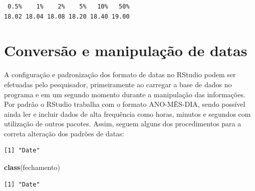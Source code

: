 \documentclass[12pt,brazil,oneside]{book}
\newenvironment{Shaded}{\begin{snugshade}}{\end{snugshade}}
\newcommand{\CommentTok}[1]{\textcolor[rgb]{0.56,0.35,0.01}{\textit{#1}}}
\newcommand{\DataTypeTok}[1]{\textcolor[rgb]{0.13,0.29,0.53}{#1}}
\newcommand{\KeywordTok}[1]{\textcolor[rgb]{0.13,0.29,0.53}{\textbf{#1}}}
\newcommand{\NormalTok}[1]{#1}
\newcommand{\StringTok}[1]{\textcolor[rgb]{0.31,0.60,0.02}{#1}}
\begin{document}
\begin{verbatim}
 0.5%    1%    2%    5%   10%   50% 
18.02 18.04 18.08 18.20 18.40 19.00 
\end{verbatim}

\hypertarget{conversao-e-manipulacao-de-datas}{%
\section{Conversão e manipulação de datas}\label{conversao-e-manipulacao-de-datas}}

A configuração e padronização dos formato de datas no RStudio podem ser efetuadas pelo pesquisador, primeiramente ao carregar a base de dados no programa e em um segundo momento durante a manipulação das informações. Por padrão o RStudio trabalha com o formato ANO-MÊS-DIA, sendo possível ainda ler e incluir dados de alta frequência como horas, minutos e segundos com utilização de outros pacotes. Assim, seguem alguns dos procedimentos para a correta alteração dos padrões de datas:

\begin{Shaded}
\end{Shaded}

\begin{verbatim}
[1] "Date"
\end{verbatim}

\begin{Shaded}
\begin{Highlighting}[]
\KeywordTok{class}\NormalTok{(fechamento)}
\end{Highlighting}
\end{Shaded}

\begin{verbatim}
[1] "Date"
\end{verbatim}
\end{document}
